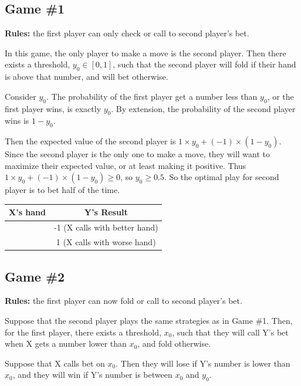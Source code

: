 \documentclass[12pt]{article}
\begin{document}
\subsection{Game \#1}

\textbf{Rules:} the first player can only check or call to second player's bet.

\hspace{\parindent}In this game, the only player to make a move is the second player. Then there exists a threshold, $y_0 \in \left[0,1\right]$, such that the second player will fold if their hand is above that number, and will bet otherwise. 

Consider $y_0$. The probability of the first player get a number less than $y_0$, or the first player wins, is exactly $y_0$. By extension, the probability of the second player wins is $1-y_0$. 

Then the expected value of the second player is $1\times y_0 + (-1) \times(1-y_0)$. Since the second player is the only one to make a move, they will want to maximize their expected value, or at least making it positive. Thus $1\times y_0 + (-1)\times(1-y_0) \ge 0$, so $y_0 \ge 0.5$. So the optimal play for second player is to bet half of the time.

\begin{center}
\begin{tabular}{|c | c|} 
 \hline
 \textbf{X's hand} & \textbf{Y's Result} \\ [0.5ex] 
 \hline
 [0,$y_0$] & -1 (X calls with better hand)  \\ 
 \hline
 [$y_0$,1] & 1 (X calls with worse hand)\\
    \hline
\end{tabular}
\end{center}

\subsection{Game \#2}

\textbf{Rules:} the first player can now fold or call to second player's bet.

Suppose that the second player plays the same strategies as in Game \#1. Then, for the first player, there exists a threshold, $x_0$, such that they will call Y's bet when X gets a number lower than $x_0$, and fold otherwise. 

Suppose that X calls bet on $x_0$. Then they will lose if Y's number is lower than $x_0$, and they will win if Y's number is between $x_0$ and $y_0$. 
\end{document}
